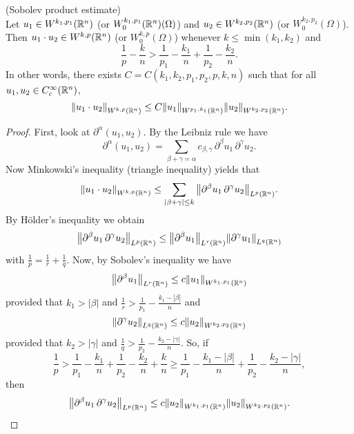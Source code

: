 \documentclass[11pt]{article}
\begin{document}
    		\begin{thm}(Sobolev product estimate)\\
    			Let $u_1\in W^{k_1,p_1}(\mathbb{R}^n)$ (or $W^{k_1,p_1}_0(\mathbb{R}^n)(\Omega)$) and $u_2\in W^{k_2,p_2}(\mathbb{R}^n)$ (or $W^{k_2,p_2}_0(\Omega)$). Then $u_1\cdot u_2\in W^{k,p}(\mathbb{R}^n)$ (or $W^{k,p}_0(\Omega)$) whenever $k\le\min(k_1,k_2)$ and
    			\begin{equation*}
    				\frac{1}{p}-\frac{k}{n}>\frac{1}{p_1}-\frac{k_1}{n}+\frac{1}{p_2}-\frac{k_2}{n}.
    			\end{equation*}
    			In other words, there exists $C=C(k_1,k_2,p_1,p_2,p,k,n)$ such that for all $u_1,u_2\in C^\infty_c(\mathbb{R}^n)$,
    			\begin{equation*}
    				\norm{u_1\cdot u_2}_{W^{k,p}(\mathbb{R}^n)}\le C\norm{u_1}_{W^{p_1,k_1}(\mathbb{R}^n)}\norm{u_2}_{W^{k_2,p_2}(\mathbb{R}^n)}.
    			\end{equation*}
    		\end{thm}
    		\begin{proof}
    			First, look at $\partial^\alpha(u_1,u_2)$. By the Leibniz rule we have
    			\begin{equation*}
    				\partial^\alpha(u_1,u_2)=\sum_{\beta+\gamma=\alpha}c_{\beta,\gamma}\,\partial^\beta u_1\,\partial^\gamma u_2.
    			\end{equation*}
    			Now Minkowski's inequality (triangle inequality) yields that
    			\begin{equation*}
    				\norm{u_1\cdot u_2}_{W^{k,p}(\mathbb{R}^n)}\le\sum_{|\beta+\gamma|\le k}\norm{\partial^\beta u_1\,\partial^\gamma u_2}_{L^p(\mathbb{R}^n)}.
    			\end{equation*}
    			By H{\"o}lder's inequality we obtain
    			\begin{equation*}
    				\norm{\partial^\beta u_1\,\partial^\gamma u_2}_{L^p(\mathbb{R}^n)}\le\norm{\partial^\beta u_1}_{L^r(\mathbb{R}^n)}\norm{\partial^\gamma u_1}_{L^q(\mathbb{R}^n)}
    			\end{equation*}
    			with $\frac{1}{p}=\frac{1}{r}+\frac{1}{q}$. Now, by Sobolev's inequality we have 
    			\begin{equation*}
    				\norm{\partial^\beta u_1}_{L^r(\mathbb{R}^n)}\le c\norm{u_{1}}_{W^{k_1,p_1}(\mathbb{R}^{n})}	
    			\end{equation*}
    			provided that $k_1>|\beta|$ and $\frac{1}{r}>\frac{1}{p_1}-\frac{k_1-|\beta|}{n}$ and 
    			\begin{equation*}
    				\norm{\partial^\gamma u_2}_{L^q(\mathbb{R}^n)}\le c\norm{u_{2}}_{W^{k_2,p_2}(\mathbb{R}^{n})}	
    			\end{equation*}
    			provided that $k_2>|\gamma|$ and $\frac{1}{q}>\frac{1}{p_2}-\frac{k_2-|\gamma|}{n}$. So, if
    			\begin{equation*}
    				\frac{1}{p}>\frac{1}{p_1}-\frac{k_1}{n}+\frac{1}{p_2}-\frac{k_2}{n}+\frac{k}{n}\ge
    				\frac{1}{p_1}-\frac{k_1-|\beta|}{n}+\frac{1}{p_2}-\frac{k_2-|\gamma|}{n},
    			\end{equation*}
    			then
    			\begin{equation*}
    				\norm{\partial^\beta u_1\,\partial^\gamma u_2}_{L^p(\mathbb{R}^n)}\le c\norm{u_2}_{W^{k_1,p_1}(\mathbb{R}^n)}\norm{u_2}_{W^{k_2,p_2}(\mathbb{R}^n)}.
    			\end{equation*}
    		\end{proof}
    
\end{document}
